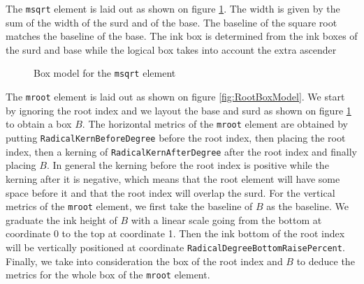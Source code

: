 The {\tt msqrt} element is laid out as shown on figure
\ref{fig:SquareRootBoxModel}.
The width is given by the sum of the width of the surd and of the base.
The baseline of the square root matches the baseline of the base.
The ink box is determined from the ink boxes of the surd and base while the
logical box takes into account the extra ascender

\begin{figure}
\centering
{}
\caption{Box model for the {\tt msqrt} element}
\label{fig:SquareRootBoxModel}
\end{figure}

The {\tt mroot} element is laid out as shown on figure \ref{fig:RootBoxModel}.
We start by ignoring the root index and we layout the base and surd as
shown on figure \ref{fig:SquareRootBoxModel} to obtain a box $B$.
The horizontal metrics of the {\tt mroot} element are obtained by putting
{\tt RadicalKernBeforeDegree}
before the root index, then placing the root index, then a kerning
of {\tt RadicalKernAfterDegree}
after the root index and finally placing $B$. In general
the kerning before the root index is positive while the kerning after it is
negative,
which means that the root element will have some space before it and that the
root index will overlap the surd.
For the vertical metrics of the {\tt mroot} element, we first take the baseline
of $B$ as the baseline. We graduate the ink height of $B$ with a linear
scale going from the bottom at coordinate 0 to the top at coordinate 1.
Then the ink bottom of the root index will
be vertically positioned at coordinate
{\tt RadicalDegreeBottomRaisePercent}.
Finally, we take into consideration the box of the root index and $B$ to deduce
the metrics for the whole box of the {\tt mroot} element.

